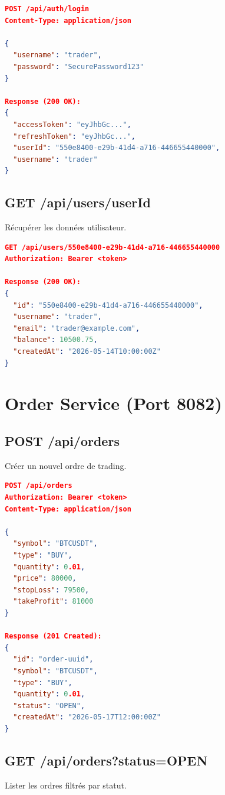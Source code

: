 \documentclass[12pt,a4paper,twoside]{report}
\begin{document}
\begin{lstlisting}[language=json]
POST /api/auth/login
Content-Type: application/json

{
  "username": "trader",
  "password": "SecurePassword123"
}

Response (200 OK):
{
  "accessToken": "eyJhbGc...",
  "refreshToken": "eyJhbGc...",
  "userId": "550e8400-e29b-41d4-a716-446655440000",
  "username": "trader"
}
\end{lstlisting}

\subsection{GET /api/users/{userId}}
Récupérer les données utilisateur.

\begin{lstlisting}[language=json]
GET /api/users/550e8400-e29b-41d4-a716-446655440000
Authorization: Bearer <token>

Response (200 OK):
{
  "id": "550e8400-e29b-41d4-a716-446655440000",
  "username": "trader",
  "email": "trader@example.com",
  "balance": 10500.75,
  "createdAt": "2026-05-14T10:00:00Z"
}
\end{lstlisting}

\section{Order Service (Port 8082)}

\subsection{POST /api/orders}
Créer un nouvel ordre de trading.

\begin{lstlisting}[language=json]
POST /api/orders
Authorization: Bearer <token>
Content-Type: application/json

{
  "symbol": "BTCUSDT",
  "type": "BUY",
  "quantity": 0.01,
  "price": 80000,
  "stopLoss": 79500,
  "takeProfit": 81000
}

Response (201 Created):
{
  "id": "order-uuid",
  "symbol": "BTCUSDT",
  "type": "BUY",
  "quantity": 0.01,
  "status": "OPEN",
  "createdAt": "2026-05-17T12:00:00Z"
}
\end{lstlisting}

\subsection{GET /api/orders?status=OPEN}
Lister les ordres filtrés par statut.
\end{document}
